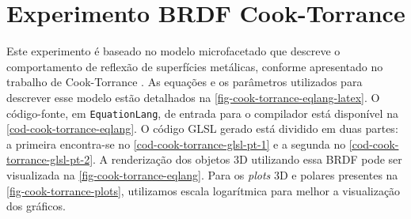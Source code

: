 \section{Experimento BRDF Cook-Torrance}\label{sec:cook-torrance}


Este experimento é baseado no modelo microfacetado que descreve o comportamento de reflexão de superfícies metálicas, conforme apresentado no trabalho de Cook-Torrance \cite{cook1982reflectance}. As equações e os parâmetros utilizados para descrever esse modelo estão detalhados na \autoref{fig-cook-torrance-eqlang-latex}. O código-fonte, em \texttt{EquationLang}, de entrada para o compilador está disponível na \autoref{cod-cook-torrance-eqlang}. O código GLSL gerado está dividido em duas partes: a primeira encontra-se no \autoref{cod-cook-torrance-glsl-pt-1} e a segunda no \autoref{cod-cook-torrance-glsl-pt-2}. A renderização dos objetos 3D utilizando essa BRDF pode ser visualizada na \autoref{fig-cook-torrance-eqlang}. Para os \textit{plots} 3D e polares presentes na \autoref{fig-cook-torrance-plots}, utilizamos escala logarítmica para melhor a visualização dos gráficos.
